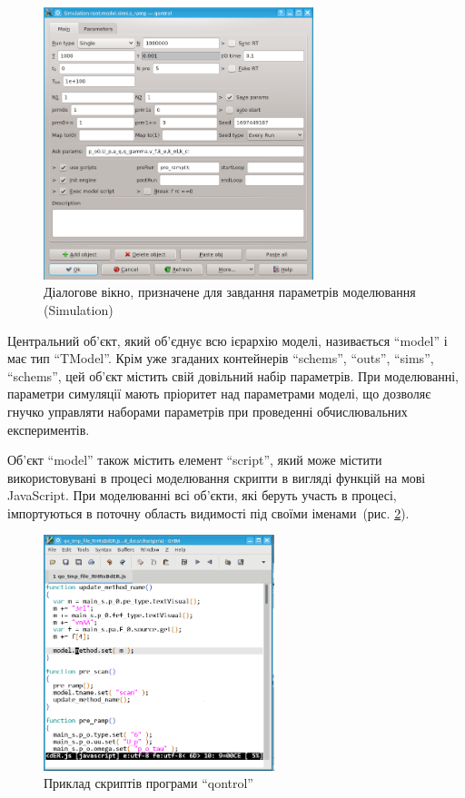 \begin{figure}[htb!]
  \begin{center}
    \includegraphics[width=0.7\textwidth]{p/qontrol_task.png}
  \end{center}
\caption{Діалогове вікно, призначене для завдання параметрів моделювання (Simulation)}
  \label{atu:f:qontrol_simul}
\end{figure}


Центральний об'єкт, який об'єднує всю ієрархію моделі,
називається ``model'' і має тип ``TModel''. Крім уже згаданих контейнерів
``schems'', ``outs'', ``sims'', ``schems'', цей об'єкт містить свій довільний
набір параметрів. При моделюванні, параметри симуляції
мають пріоритет над параметрами моделі, що дозволяє гнучко
управляти наборами параметрів при проведенні обчислювальних
експериментів.

Об'єкт ``model'' також містить елемент ``script'', який може містити
використовувані в процесі моделювання скрипти в вигляді функцій
на мові JavaScript. При моделюванні всі об'єкти, які беруть участь в
процесі, імпортуються в поточну область видимості під своїми
іменами~(рис. \ref{atu:f:qontrol_js}).


\begin{figure}[htb!]
  \begin{center}
    \includegraphics[width=0.6\textwidth]{p/qontrol_js.png}
  \end{center}
\caption{Приклад скриптів програми ``qontrol''}
  \label{atu:f:qontrol_js}
\end{figure}



